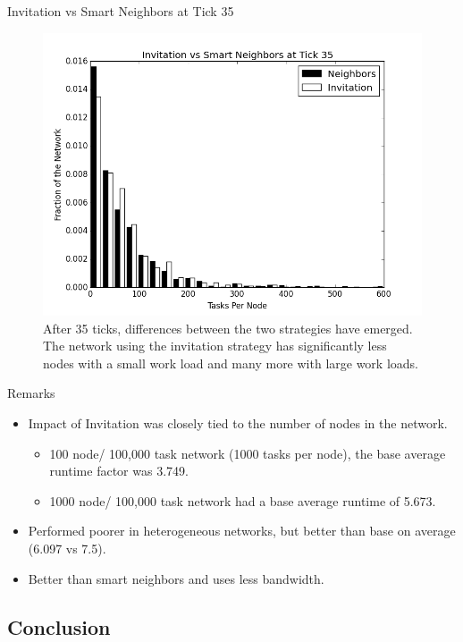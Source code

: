 \documentclass[11pt]{beamer}
\begin{document}
\begin{frame}{Invitation vs Smart Neighbors at Tick 35}

\begin{figure}
	\centering
	\includegraphics[width=0.7\linewidth]{figs/inviteNeighborsHist35}
	\caption[Invitation vs smart neighbor injection after 35 ticks.]{After 35 ticks, differences between the two strategies have emerged.  The network using the invitation strategy has significantly less nodes with a small work load and many more with large work loads.}
	\label{fig:inviteNeighborsHist35}
\end{figure}

\end{frame}



\begin{frame}{Remarks}
	\begin{itemize}
		\item Impact of Invitation was closely tied to the number of nodes in the network.
		\begin{itemize}
			\item 100 node/ 100,000 task network (1000 tasks per node), the base average runtime factor was 3.749.
			\item 1000 node/ 100,000 task network had a base average runtime of 5.673.
		\end{itemize}
		\item Performed poorer in heterogeneous networks, but better than base on average (6.097 vs 7.5).
		\item Better than smart neighbors and uses less bandwidth.
	\end{itemize}
\end{frame}

\subsection{Conclusion}
\end{document}
